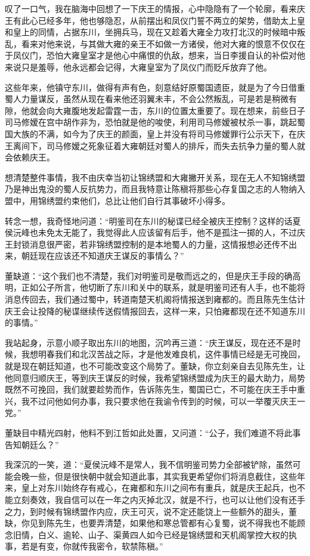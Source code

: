 叹了一口气，我在脑海中回想了一下庆王的情报，心中隐隐有了一个轮廓，看来庆王有此心已经多年，他也够隐忍，从前摆出和凤仪门誓不两立的架势，借助太上皇和皇上的同情，占据东川，坐拥兵马，现在又趁着大雍全力攻打北汉的时候暗中叛乱，看来对他来说，与其做大雍的亲王不如做一方诸侯，他对大雍的恨意不仅仅在于凤仪门，恐怕大雍皇室才是他心中痛恨的仇敌，想来，当日李援自认的补偿对他来说只是羞辱，他永远都会记得，大雍皇室为了凤仪门而贬斥放弃了他。

这些年来，他镇守东川，做得有声有色，刻意结好原蜀国遗臣，就是为了今日借重蜀人力量谋反，虽然从现在看来他还羽翼未丰，不会公然叛乱，可是若是稍微有隙，他就会向大雍腹地发起雷霆一击，东川的位置太重要了。现在想来，前些日子司马修嫒在宫中胡作非为，恐怕就是他的唆使，利用司马修嫒被杖杀一事，跳起蜀国大族的不满，如今为了庆王的颜面，皇上并没有将司马修嫒罪行公示天下，在庆王离间下，司马修嫒之死象征着大雍朝廷对蜀人的排斥，而失去抗争力量的蜀人就会依赖庆王。

想清楚整件事情，我不由庆幸当初让锦绣盟和大雍撇开关系，现在无人不知锦绣盟乃是神出鬼没的蜀人反抗势力，而且我特意让陈稹将那些心存复国之志的人物纳入盟中，用锦绣盟约束他们，总比让他们自行其事破坏小得多。

转念一想，我奇怪地问道：“明鉴司在东川的秘谍已经全被庆王控制？这样的话夏侯沅峰也未免太无能了，我觉得此人应该留有后手，他不是孤注一掷的人，不过庆王封锁消息很严密，若非锦绣盟控制的是本地蜀人的力量，这情报想必还传不出来，朝廷现在应该还不知道庆王谋反的事情么？”

董缺道：“这个我们也不清楚，我们对明鉴司是敬而远之的，但是庆王手段的确高明，正如公子所言，他切断了东川和关中的联系，就是明鉴司还有人手，也不能将消息传回去，我们通过蜀中，转道南楚天机阁将情报送到雍都的。而且陈先生估计庆王会让投降的秘谍继续传送假情报回去，这样一来，只怕雍都现在还不知道东川的事情。”

我站起身，示意小顺子取出东川的地图，沉吟再三道：“庆王谋反，现在还不是时候，我想明春我们和北汉苦战之际，才是他发难良机，这件事情已经是无可挽回，就是现在朝廷知道，也不可能改变这个局势了。董缺，你立刻亲自去见陈先生，让他同意归顺庆王，等到庆王谋反的时候，我希望锦绣盟成为庆王的最大助力，局势既然不可挽回，我们就要趁势而作，告诉陈先生，蜀国已亡，不可能在庆王手中重兴，我不过问他如何办事，我只要求他在我谕令传到的时候，可以一举覆灭庆王一党。”

董缺目中精光四射，他料不到江哲如此处置，又问道：“公子，我们难道不将此事告知朝廷么？”

我深沉的一笑，道：“夏侯沅峰不是常人，我不信明鉴司势力全部被铲除，虽然可能会晚一些，但是很快朝中就会知道此事，其实我更希望你们将消息截住，这些年来，皇上对东川始终存有戒心，在雍都和东川之间布有重兵，就是庆王起兵，也不能立刻奏效，我自信可以在一年之内灭掉北汉，就是不行，也可以让他们没有还手之力，到时候有锦绣盟作内应，庆王可灭，说不定还能饶上一些额外的甜头，董缺，你见到陈先生，也要弄清楚，如果他和寒总管都有心复蜀，说不得我也不能顾念旧情，白义、逾轮、山子、渠黄四人如今已经是锦绣盟和天机阁掌控大权的执事，若是有变，你就传我密令，软禁陈稹。”

